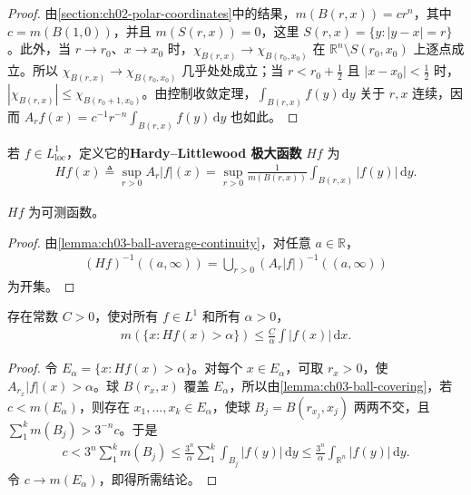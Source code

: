 \documentclass[../../main.tex]{subfiles}%
\begin{document}
\begin{proof}
由\cref{section:ch02-polar-coordinates}中的结果，$m(B(r,x))=cr^n$，其中 $c=m(B(1,0))$，并且 $m(S(r,x))=0$，这里 $S(r,x)=\{y:|y-x|=r\}$。此外，当 $r\to r_0$、$x\to x_0$ 时，$\chi_{B(r,x)}\to\chi_{B(r_0,x_0)}$ 在 $\mathbb{R}^n\setminus S(r_0,x_0)$ 上逐点成立。所以 $\chi_{B(r,x)}\to\chi_{B(r_0,x_0)}$ 几乎处处成立；当 $r<r_0+\frac12$ 且 $|x-x_0|<\frac12$ 时，$|\chi_{B(r,x)}|\le\chi_{B(r_0+1,x_0)}$。由控制收敛定理，$\int_{B(r,x)}f(y)\,\mathrm{d}y$ 关于 $r,x$ 连续，因而 $A_rf(x)=c^{-1}r^{-n}\int_{B(r,x)}f(y)\,\mathrm{d}y$ 也如此。
\end{proof}
\begin{definition}\label{definition:ch03-hardy-littlewood-maximal}
若 $f\in L^1_{\mathrm{loc}}$，定义它的\textbf{Hardy–Littlewood 极大函数} $Hf$ 为
\begin{align*}
Hf(x)\triangleq\sup_{r>0}A_r|f|(x)
=\sup_{r>0}\frac{1}{m(B(r,x))}\int_{B(r,x)}|f(y)|\,\mathrm{d}y.
\end{align*}
\end{definition}
\begin{proposition}\label{proposition:ch03-maximal-measurable}
$Hf$ 为可测函数。
\end{proposition}
\begin{proof}
由\cref{lemma:ch03-ball-average-continuity}，对任意 $a\in\mathbb{R}$，
\begin{align*}
(Hf)^{-1}((a,\infty))=\bigcup_{r>0}(A_r|f|)^{-1}((a,\infty))
\end{align*}
为开集。
\end{proof}
\begin{theorem}[极大定理]\label{theorem:ch03-maximal}
存在常数 $C>0$，使对所有 $f\in L^1$ 和所有 $\alpha>0$，
\begin{align*}
m(\{x:Hf(x)>\alpha\})\le\frac{C}{\alpha}\int|f(x)|\,\mathrm{d}x.
\end{align*}
\end{theorem}
\begin{proof}
令 $E_\alpha=\{x:Hf(x)>\alpha\}$。对每个 $x\in E_\alpha$，可取 $r_x>0$，使 $A_{r_x}|f|(x)>\alpha$。球 $B(r_x,x)$ 覆盖 $E_\alpha$，所以由\cref{lemma:ch03-ball-covering}，若 $c<m(E_\alpha)$，则存在 $x_1,\ldots,x_k\in E_\alpha$，使球 $B_j=B(r_{x_j},x_j)$ 两两不交，且 $\sum_1^k m(B_j)>3^{-n}c$。于是
\begin{align*}
c<3^n\sum_1^k m(B_j)
\le\frac{3^n}{\alpha}\sum_1^k\int_{B_j}|f(y)|\,\mathrm{d}y
\le\frac{3^n}{\alpha}\int_{\mathbb{R}^n}|f(y)|\,\mathrm{d}y.
\end{align*}
令 $c\to m(E_\alpha)$，即得所需结论。
\end{proof}
\end{document}
